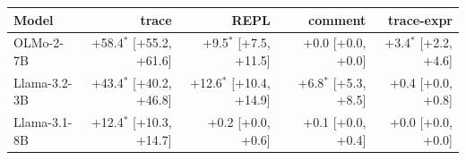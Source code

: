 \begin{tabular}{@{}lrrrr@{}}
\toprule
Model & trace & REPL & comment & trace-expr \\
\midrule
OLMo-2-7B & +58.4$^{*}$ [+55.2, +61.6] & +9.5$^{*}$ [+7.5, +11.5] & +0.0 [+0.0, +0.0] & +3.4$^{*}$ [+2.2, +4.6] \\
Llama-3.2-3B & +43.4$^{*}$ [+40.2, +46.8] & +12.6$^{*}$ [+10.4, +14.9] & +6.8$^{*}$ [+5.3, +8.5] & +0.4 [+0.0, +0.8] \\
Llama-3.1-8B & +12.4$^{*}$ [+10.3, +14.7] & +0.2 [+0.0, +0.6] & +0.1 [+0.0, +0.4] & +0.0 [+0.0, +0.0] \\
\bottomrule
\end{tabular}

